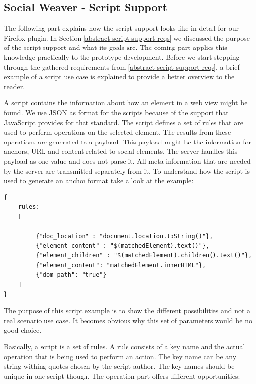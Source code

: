 \newpage
\subsection{Social Weaver - Script Support}\label{sowe-script-support}
The following part explains how the script support looks like in detail for our Firefox plugin. In Section \ref{abstract-script-support-reqs} we discussed the purpose of the script support and what its goals are. The coming part applies this knowledge practically to the prototype development. Before we start stepping through the gathered requirements from \ref{abstract-script-support-reqs}, a brief example of a script use case is explained to provide a better overview to the reader.

A script contains the information about how an element in a web view might be found. We use JSON as format for the scripts because of the support that JavaScript provides for that standard. The script defines a set of rules that are used to perform operations on the selected element. The results from these operations are generated to a payload. This payload might be the information for anchors, URL and content related to social elements. The server handles this payload as one value and does
 not
 parse it. All meta information that are needed by the server are transmitted separately from it. To understand how the script is used to generate an anchor format take a look at the example:

\begin{lstlisting}
{
    rules:
    [

         {"doc_location" : "document.location.toString()"},
         {"element_content" : "$(matchedElement).text()"},
         {"element_children" : "$(matchedElement).children().text()"},
         {"element_content": "matchedElement.innerHTML"},
         {"dom_path": "true"}	
    ]
}
\end{lstlisting}

The purpose of this script example is to show the different possibilities and not a real scenario use case. It 
 becomes obvious why this set of parameters would be no good choice. 

Basically, a script is a set of rules. A rule consists of a key name and the actual operation that is being used to perform an action. The key name can be any string withing quotes chosen by the script author. The key names should be unique in one script though. The operation part offers different opportunities:

